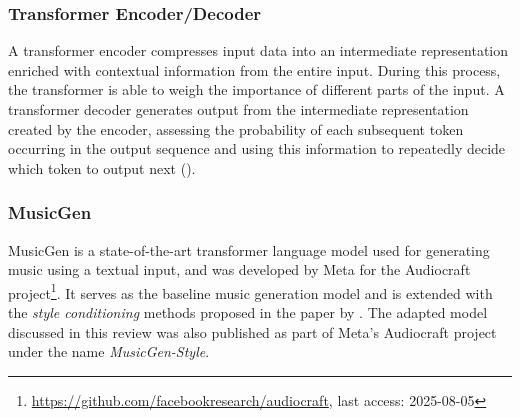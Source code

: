 \documentclass[a4paper,12pt,twoside]{article}
\begin{document}
\subsubsection*{Transformer Encoder/Decoder}\label{sec:transformerEncoderDecoder}

A transformer encoder compresses input data into an intermediate representation enriched with contextual information from the entire input. During this process, the transformer is able to weigh the importance of different parts of the input. A transformer decoder generates output from the intermediate representation created by the encoder, assessing the probability of each subsequent token occurring in the output sequence and using this information to repeatedly decide which token to output next (\cite{vaswaniAttentionAllYou2017}).

\subsubsection*{MusicGen}\label{sec:MusicGen}

MusicGen is a state-of-the-art transformer language model used for generating music using a textual input, and was developed by Meta for the Audiocraft project\footnote{\url{https://github.com/facebookresearch/audiocraft}, last access: 2025-08-05}. It serves as the baseline music generation model and is extended with the \textit{style conditioning} methods proposed in the paper by \cite{rouardAudioConditioningMusic2024}. The adapted model discussed in this review was also published as part of Meta's Audiocraft project under the name \textit{MusicGen-Style}.
\end{document}
